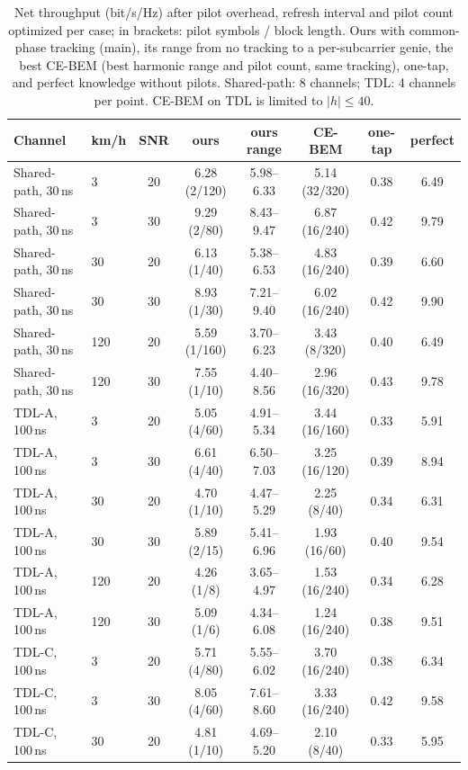 \begin{table}[!htbp]\centering
\caption{Net throughput (bit/s/Hz) after pilot overhead, refresh interval and pilot count optimized per case; in brackets: pilot symbols / block length. Ours with common-phase tracking (main), its range from no tracking to a per-subcarrier genie, the best CE-BEM (best harmonic range and pilot count, same tracking), one-tap, and perfect knowledge without pilots. Shared-path: 8 channels; TDL: 4 channels per point. CE-BEM on TDL is limited to $|h|\le40$.}\label{tab:overhead}
\begin{tabular}{llcccccc}\toprule
Channel & km/h & SNR & ours & ours range & CE-BEM & one-tap & perfect\\\midrule
Shared-path, 30\,ns & 3 & 20 & 6.28 (2/120) & 5.98--6.33 & 5.14 (32/320) & 0.38 & 6.49\\
Shared-path, 30\,ns & 3 & 30 & 9.29 (2/80) & 8.43--9.47 & 6.87 (16/240) & 0.42 & 9.79\\
Shared-path, 30\,ns & 30 & 20 & 6.13 (1/40) & 5.38--6.53 & 4.83 (16/240) & 0.39 & 6.60\\
Shared-path, 30\,ns & 30 & 30 & 8.93 (1/30) & 7.21--9.40 & 6.02 (16/240) & 0.42 & 9.90\\
Shared-path, 30\,ns & 120 & 20 & 5.59 (1/160) & 3.70--6.23 & 3.43 (8/320) & 0.40 & 6.49\\
Shared-path, 30\,ns & 120 & 30 & 7.55 (1/10) & 4.40--8.56 & 2.96 (16/320) & 0.43 & 9.78\\
\midrule
TDL-A, 100\,ns & 3 & 20 & 5.05 (4/60) & 4.91--5.34 & 3.44 (16/160) & 0.33 & 5.91\\
TDL-A, 100\,ns & 3 & 30 & 6.61 (4/40) & 6.50--7.03 & 3.25 (16/120) & 0.39 & 8.94\\
TDL-A, 100\,ns & 30 & 20 & 4.70 (1/10) & 4.47--5.29 & 2.25 (8/40) & 0.34 & 6.31\\
TDL-A, 100\,ns & 30 & 30 & 5.89 (2/15) & 5.41--6.96 & 1.93 (16/60) & 0.40 & 9.54\\
TDL-A, 100\,ns & 120 & 20 & 4.26 (1/8) & 3.65--4.97 & 1.53 (16/240) & 0.34 & 6.28\\
TDL-A, 100\,ns & 120 & 30 & 5.09 (1/6) & 4.34--6.08 & 1.24 (16/240) & 0.38 & 9.51\\
\midrule
TDL-C, 100\,ns & 3 & 20 & 5.71 (4/80) & 5.55--6.02 & 3.70 (16/240) & 0.38 & 6.34\\
TDL-C, 100\,ns & 3 & 30 & 8.05 (4/60) & 7.61--8.60 & 3.33 (16/240) & 0.42 & 9.58\\
TDL-C, 100\,ns & 30 & 20 & 4.81 (1/10) & 4.69--5.20 & 2.10 (8/40) & 0.33 & 5.95\\

\end{tabular}
\end{table}
